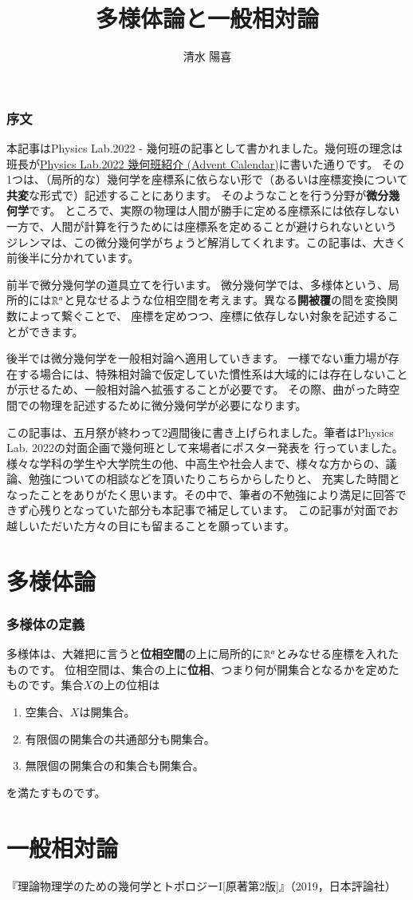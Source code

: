 \documentclass[dvipdfmx, a4paper]{jsarticle}
\title{多様体論と一般相対論}
\author{清水 陽喜}
\begin{document}
\maketitle

\section{序文}
本記事はPhysics Lab.2022 - 幾何班の記事として書かれました。幾何班の理念は班長が\href{https://event.phys.s.u-tokyo.ac.jp/physlab2022/posts/02/}{Physics Lab.2022 幾何班紹介 (Advent Calendar)}に書いた通りです。
その1つは、（局所的な）幾何学を座標系に依らない形で（あるいは座標変換について\textbf{共変}な形式で）記述することにあります。
そのようなことを行う分野が\textbf{微分幾何学}です。
ところで、実際の物理は人間が勝手に定める座標系には依存しない一方で、人間が計算を行うためには座標系を定めることが避けられないという
ジレンマは、この微分幾何学がちょうど解消してくれます。この記事は、大きく前後半に分かれています。

前半で微分幾何学の道具立てを行います。
微分幾何学では、多様体という、局所的には$\mathbb{R}^n$と見なせるような位相空間を考えます。異なる\textbf{開被覆}の間を変換関数によって繋ぐことで、
座標を定めつつ、座標に依存しない対象を記述することができます。

後半では微分幾何学を一般相対論へ適用していきます。
一様でない重力場が存在する場合には、特殊相対論で仮定していた慣性系は大域的には存在しないことが示せるため、一般相対論へ拡張することが必要です。
その際、曲がった時空間での物理を記述するために微分幾何学が必要になります。

この記事は、五月祭が終わって2週間後に書き上げられました。筆者はPhysics Lab. 2022の対面企画で幾何班として来場者にポスター発表を
行っていました。様々な学科の学生や大学院生の他、中高生や社会人まで、様々な方からの、議論、勉強についての相談などを頂いたりこちらからしたりと、
充実した時間となったことをありがたく思います。その中で、筆者の不勉強により満足に回答できず心残りとなっていた部分も本記事で補足しています。
この記事が対面でお越しいただいた方々の目にも留まることを願っています。

\tableofcontents

\part{多様体論}
\section{多様体の定義}
多様体は、大雑把に言うと\textbf{位相空間}の上に局所的に$\mathbb{R}^n$とみなせる座標を入れたものです。
位相空間は、集合の上に\textbf{位相}、つまり何が開集合となるかを定めたものです。集合$X$の上の位相は
\begin{enumerate}
  \item 空集合、$X$は開集合。
  \item 有限個の開集合の共通部分も開集合。
  \item 無限個の開集合の和集合も開集合。
\end{enumerate}
を満たすものです。

\part{一般相対論}

\begin{thebibliography}{9}
   『理論物理学のための幾何学とトポロジーI[原著第2版]』（2019，日本評論社）
\end{thebibliography}
\end{document}
